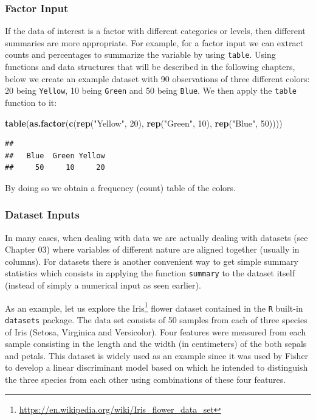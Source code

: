 \documentclass[12pt,]{krantz}
\newenvironment{Shaded}{\begin{snugshade}}{\end{snugshade}}
\newcommand{\KeywordTok}[1]{\textcolor[rgb]{0.27,0.27,0.27}{\textbf{#1}}}
\newcommand{\DecValTok}[1]{\textcolor[rgb]{0.06,0.06,0.06}{#1}}
\newcommand{\StringTok}[1]{\textcolor[rgb]{0.5,0.5,0.5}{#1}}
\newcommand{\NormalTok}[1]{#1}
\renewcommand{\href}[2]{#2\footnote{\url{#1}}}
\begin{document}
\subsubsection{Factor Input}\label{factor-input}

If the data of interest is a factor with different categories or levels,
then different summaries are more appropriate. For example, for a factor
input we can extract counts and percentages to summarize the variable by
using \texttt{table}. Using functions and data structures that will be
described in the following chapters, below we create an example dataset
with 90 observations of three different colors: 20 being
\texttt{Yellow}, 10 being \texttt{Green} and 50 being \texttt{Blue}. We
then apply the \texttt{table} function to it:

\begin{Shaded}
\begin{Highlighting}[]
\KeywordTok{table}\NormalTok{(}\KeywordTok{as.factor}\NormalTok{(}\KeywordTok{c}\NormalTok{(}\KeywordTok{rep}\NormalTok{(}\StringTok{"Yellow"}\NormalTok{, }\DecValTok{20}\NormalTok{), }\KeywordTok{rep}\NormalTok{(}\StringTok{"Green"}\NormalTok{, }\DecValTok{10}\NormalTok{), }\KeywordTok{rep}\NormalTok{(}\StringTok{"Blue"}\NormalTok{, }\DecValTok{50}\NormalTok{))))}
\end{Highlighting}
\end{Shaded}

\begin{verbatim}
## 
##   Blue  Green Yellow 
##     50     10     20
\end{verbatim}

By doing so we obtain a frequency (count) table of the colors.

\subsubsection{Dataset Inputs}\label{dataset-inputs}

In many cases, when dealing with data we are actually dealing with
datasets (see Chapter 03) where variables of different nature are
aligned together (usually in columns). For datasets there is another
convenient way to get simple summary statistics which consists in
applying the function \texttt{summary} to the dataset itself (instead of
simply a numerical input as seen earlier).

As an example, let us explore the
\href{https://en.wikipedia.org/wiki/Iris_flower_data_set}{Iris} flower
dataset contained in the \texttt{R} built-in \texttt{datasets} package.
The data set consists of 50 samples from each of three species of Iris
(Setosa, Virginica and Versicolor). Four features were measured from
each sample consisting in the length and the width (in centimeters) of
the both sepals and petals. This dataset is widely used as an example
since it was used by Fisher to develop a linear discriminant model based
on which he intended to distinguish the three species from each other
using combinations of these four features.
\end{document}
